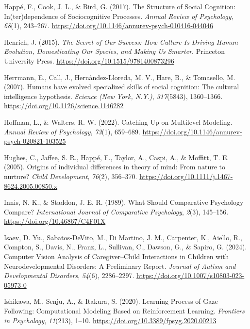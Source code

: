 \documentclass[
]{scrbook}
\newlength{\cslhangindent}
\newenvironment{CSLReferences}[2] %
 {\begin{list}{}{%
  \setlength{\itemindent}{0pt}
  \setlength{\leftmargin}{0pt}
  \setlength{\parsep}{0pt}
  \ifodd #1
   \setlength{\leftmargin}{\cslhangindent}
   \setlength{\itemindent}{-1\cslhangindent}
  \fi
  \setlength{\itemsep}{#2\baselineskip}}}
 {\end{list}}
\begin{document}
\begin{CSLReferences}{1}{0}
Happé, F., Cook, J. L., \& Bird, G. (2017). The {Structure} of {Social Cognition}: {In}(ter)dependence of {Sociocognitive Processes}. \emph{Annual Review of Psychology}, \emph{68}(1), 243--267. \url{https://doi.org/10.1146/annurev-psych-010416-044046}

Henrich, J. (2015). \emph{The {Secret} of {Our Success}: {How Culture Is Driving Human Evolution}, {Domesticating Our Species}, and {Making Us Smarter}}. Princeton University Press. \url{https://doi.org/10.1515/9781400873296}

Herrmann, E., Call, J., Hernàndez-Lloreda, M. V., Hare, B., \& Tomasello, M. (2007). Humans have evolved specialized skills of social cognition: The cultural intelligence hypothesis. \emph{Science (New York, N.Y.)}, \emph{317}(5843), 1360--1366. \url{https://doi.org/10.1126/science.1146282}

Hoffman, L., \& Walters, R. W. (2022). Catching {Up} on {Multilevel Modeling}. \emph{Annual Review of Psychology}, \emph{73}(1), 659--689. \url{https://doi.org/10.1146/annurev-psych-020821-103525}

Hughes, C., Jaffee, S. R., Happé, F., Taylor, A., Caspi, A., \& Moffitt, T. E. (2005). Origins of individual differences in theory of mind: From nature to nurture? \emph{Child Development}, \emph{76}(2), 356--370. \url{https://doi.org/10.1111/j.1467-8624.2005.00850.x}

Innis, N. K., \& Staddon, J. E. R. (1989). What {Should Comparative Psychology Compare}? \emph{International Journal of Comparative Psychology}, \emph{2}(3), 145--156. \url{https://doi.org/10.46867/C4F01X}

Isaev, D. Yu., Sabatos-DeVito, M., Di Martino, J. M., Carpenter, K., Aiello, R., Compton, S., Davis, N., Franz, L., Sullivan, C., Dawson, G., \& Sapiro, G. (2024). Computer {Vision Analysis} of {Caregiver}--{Child Interactions} in {Children} with {Neurodevelopmental Disorders}: {A Preliminary Report}. \emph{Journal of Autism and Developmental Disorders}, \emph{54}(6), 2286--2297. \url{https://doi.org/10.1007/s10803-023-05973-0}

Ishikawa, M., Senju, A., \& Itakura, S. (2020). Learning {Process} of {Gaze Following}: {Computational Modeling Based} on {Reinforcement Learning}. \emph{Frontiers in Psychology}, \emph{11}(213), 1--10. \url{https://doi.org/10.3389/fpsyg.2020.00213}


\end{CSLReferences}
\end{document}
